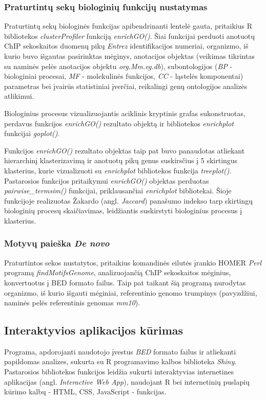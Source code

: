 \documentclass[12pt]{article}
\begin{document}
\subsubsection*{Praturtintų sekų biologinių funkcijų nustatymas}
Praturtintų sekų biologinės funkcijas apibendrinanti lentelė gauta, pritaikius R
bibliotekos \emph{clusterProfiler}\cite{CLUSTERPROFILER} funkciją
\emph{enrichGO()}. Šiai funkcijai perduoti anotuotų ChIP sekoskaitos duomenų
pikų \emph{Entrez} identifikacijos numeriai, organizmo, iš kurio buvo išgautas
pasirinktas mėginys, anotacijos objektas (veikimas tikrintas su naminės pelės
anotacijos objektu \emph{org.Mm.eg.db}), subontologijos (\emph{BP} -
biologiniai procesai, \emph{MF} - molekulinės funkcijos, \emph{CC} - ląstelės
komponentai) parametras bei įvairūs statistiniai įverčiai, reikalingi genų
ontologijos analizės atlikimui.

Biologinius procesus vizualizuojantis aciklinis kryptinis grafas sukonstruotas,
perdavus funkcijos \emph{enrichGO()} rezultato objektą ir bibliotekos
\emph{enrichplot}\cite{ENRICHPLOT} funkcijai \emph{goplot()}.

Funkcijos \emph{enrichGO()} rezultato objektas taip pat buvo panaudotas
atliekant hierarchinį klasterizavimą ir anotuotų pikų genus suskirsčius į
5 skirtingus klasterius, kurie vizualizuoti su \emph{enrichplot} bibliotekos
funkcija \emph{treeplot()}. Pastarosios funkcijos pritaikymui \emph{enrichGO()}
objektas perduotas \emph{pairwise\_termsim()} funkcijai, priklausančiai
\emph{enrichplot} bibliotekai. Šioje funkcijoje realizuotas Žakardo
(angl. \emph{Jaccard}) panašumo indekso tarp skirtingų biologinių procesų
skaičiavimas, leidžiantis suskirstyti biologinius procesus į klasterius.

\subsubsection*{Motyvų paieška \emph{De novo}}
Praturtintos sekos nustatytos, pritaikius komandinės eilutės įrankio
HOMER\cite{HOMER} \emph{Perl} programą \emph{findMotifsGenome}, analizuojančią
ChIP sekoskaitos mėginius, konvertuotus į BED formato failus. Taip pat taikant
šią programą nurodytas organizmo, iš kurio išgauti mėginiai, referentinio genomo
trumpinys (pavyzdžiui, naminės pelės referentinis genomas \emph{mm10}).

\newpage

\subsection{Interaktyvios aplikacijos kūrimas}
Programa, apdorojanti naudotojo įvestus \emph{BED} formato failus ir atliekanti
papildomas analizes, sukurta su R programavimo kalbos biblioteka
\emph{Shiny}\cite{SHINY}. Pastarosios bibliotekos funkcijos leidžia sukurti
interaktyvias internetines aplikacijas (angl. \emph{Interactive Web App}),
naudojant R bei internetinių puslapių kūrimo kalbų - HTML, CSS, JavaScript -
funkcijas.
\end{document}
